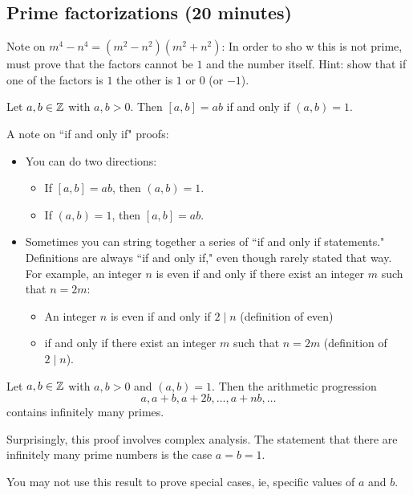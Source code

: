 \documentclass[letterpaper, 11 pt]{ximera}
\begin{document}

\subsection{Prime factorizations (20 minutes)}
Note on $m^4-n^4=(m^2-n^2)(m^2+n^2)$: In order to sho w this is not prime, must prove that the factors cannot be $1$ and the number itself. Hint: show that if one of the factors is $1$ the other is $1$ or $0$ (or $-1$).


\begin{cor*}[Corollary 1.20]\label{cor:lcm-gcd}
 Let $a,b\in\mathbb Z$ with $a,b>0$. Then $[a,b]=ab$ if and only if $(a,b)=1$.
\end{cor*}
A note on ``if and only if" proofs: 
\begin{itemize}
 \item You can do two directions: 
\begin{itemize}
 \item  If $[a,b]=ab$, then $(a,b)=1$.
 \item  If $(a,b)=1$, then $[a,b]=ab$.
\end{itemize}
\item Sometimes you can string together a series of ``if and only if statements." Definitions are always ``if and only if," even though rarely stated that way. For example, an integer $n$ is even if and only if there exist an integer $m$ such that $n=2m$:
\begin{itemize}
 \item An integer $n$ is even if and only if $2\mid n$ (definition of even) 
 \item if and only if there exist an integer $m$ such that $n=2m$ (definition of $2\mid n$).
\end{itemize}
\end{itemize}

\begin{thm*}\label{thm:dirichlet}
 Let $a,b\in\mathbb Z$ with $a,b>0$ and $(a,b)=1$. Then the arithmetic progression \[a,a+b, a+2b, \dots, a+nb,\dots\]
 contains infinitely many primes.
\end{thm*}
Surprisingly, this proof involves complex analysis. The statement that there are infinitely many prime numbers is the case $a=b=1$.


\begin{warning}
    You may not use this result to prove special cases, ie, specific values of $a$ and $b$.
\end{warning}
\end{document}
